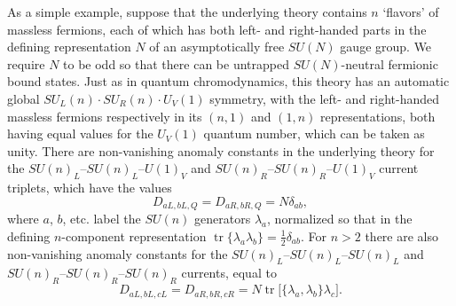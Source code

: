 As a simple example, suppose that the underlying theory contains $n$
`flavors' of massless fermions, each of which has both left- and
right-handed parts in the defining representation $N$ of an asymptotically
free $SU(N)$ gauge group. We require $N$ to be odd so that there can be
untrapped $SU(N)$-neutral fermionic bound states. Just as in quantum
chromodynamics, this theory has an automatic global
$SU_L(n)\cdot SU_R(n)\cdot U_V(1)$ symmetry, with the left- and
right-handed massless fermions respectively in its $(n,1)$ and $(1,n)$
representations, both having equal values for the $U_V(1)$ quantum number,
which can be taken as unity. There are non-vanishing anomaly constants in
the underlying theory for the
$SU(n)_L$--$SU(n)_L$--$U(1)_V$ and
$SU(n)_R$--$SU(n)_R$--$U(1)_V$ current triplets, which have the values
\[
 D_{aL,bL,Q}=D_{aR,bR,Q}=N\delta_{ab},
\]
where $a$, $b$, etc. label the $SU(n)$ generators $\lambda_a$, normalized
so that in the defining $n$-component representation
$\operatorname{tr}\{\lambda_a\lambda_b\}=\frac12\delta_{ab}$. For $n>2$
there are also non-vanishing anomaly constants for the
$SU(n)_L$--$SU(n)_L$--$SU(n)_L$ and
$SU(n)_R$--$SU(n)_R$--$SU(n)_R$ currents, equal to
\[
 D_{aL,bL,cL}=D_{aR,bR,cR}
 =N\operatorname{tr}\bigl[\{\lambda_a,\lambda_b\}\lambda_c\bigr].
\]

